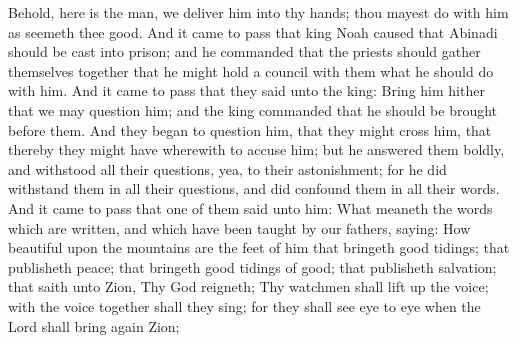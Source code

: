Behold, here is the man, we deliver him into thy hands; thou mayest do with him as seemeth thee good.
\bverse \iffalse And it came to pass that king Noah caused that Abinadi should be cast into prison; and he commanded that the priests should gather themselves together that he might hold a council with them what he should do with him. \fi
And it came to pass that king Noah caused that Abinadi should be cast into prison; and he commanded that the priests should gather themselves together that he might hold a council with them what he should do with him.
\bverse \iffalse And it came to pass that they said unto the king: Bring him hither that we may question him; and the king commanded that he should be brought before them. \fi
And it came to pass that they said unto the king: Bring him hither that we may question him; and the king commanded that he should be brought before them.
\bverse \iffalse And they began to question him, that they might cross him, that thereby they might have wherewith to accuse him; but he answered them boldly, and withstood all their questions, yea, to their astonishment; for he did withstand them in all their questions, and did confound them in all their words. \fi
And they began to question him, that they might cross him, that thereby they might have wherewith to accuse him; but he answered them boldly, and withstood all their questions, yea, to their astonishment; for he did withstand them in all their questions, and did confound them in all their words.
\bverse \iffalse And it came to pass that one of them said unto him: What meaneth the words which are written, and which have been taught by our fathers, saying: \fi
And it came to pass that one of them said unto him: What meaneth the words which are written, and which have been taught by our fathers, saying:
\bverse \iffalse How beautiful upon the mountains are the feet of him that bringeth good tidings; that publisheth peace; that bringeth good tidings of good; that publisheth salvation; that saith unto Zion, Thy God reigneth; \fi
How beautiful upon the mountains are the feet of him that bringeth good tidings; that publisheth peace; that bringeth good tidings of good; that publisheth salvation; that saith unto Zion, Thy God reigneth;
\bverse \iffalse Thy watchmen shall lift up the voice; with the voice together shall they sing; for they shall see eye to eye when the Lord shall bring again Zion; \fi
Thy watchmen shall lift up the voice; with the voice together shall they sing; for they shall see eye to eye when the Lord shall bring again Zion;

